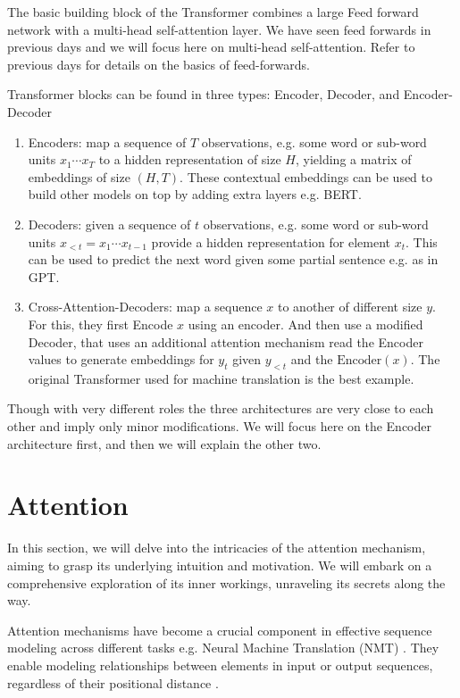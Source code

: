 The basic building block of the Transformer combines a large Feed forward network with a multi-head self-attention layer. We have seen feed forwards in previous days and we will focus here on multi-head self-attention. Refer to previous days for details on the basics of feed-forwards.

Transformer blocks can be found in three types: Encoder, Decoder, and Encoder-Decoder 

\begin{enumerate}
\item Encoders: map a sequence of $T$ observations, e.g. some word or sub-word units $x_1 \cdots x_T$ to a hidden representation of size $H$, yielding a matrix of embeddings of size $(H, T)$. These contextual embeddings can be used to build other models on top by adding extra layers e.g. BERT.
\item Decoders: given a sequence of $t$ observations, e.g. some word or sub-word units $x_{<t} = x_1 \cdots x_{t-1}$ provide a hidden representation for element $x_t$. This can be used to predict the next word given some partial sentence e.g. as in GPT. 
\item Cross-Attention-Decoders: map a sequence $x$ to another of different size $y$. For this, they first Encode $x$ using an encoder. And then use a modified Decoder, that uses an additional attention mechanism read the Encoder values to generate embeddings for $y_t$ given $y_{<t}$ and the $\mathrm{Encoder}(x)$. The original Transformer used for machine translation is the best example.
\end{enumerate}

Though with very different roles the three architectures are very close to each other and imply only minor modifications. We will focus here on the Encoder architecture first, and then we will explain the other two.

\section{Attention}
In this section, we will delve into the intricacies of the attention mechanism, aiming to grasp its underlying intuition and motivation. We will embark on a comprehensive exploration of its inner workings, unraveling its secrets along the way.

Attention mechanisms have become a crucial component in effective sequence modeling across different tasks e.g. Neural Machine Translation (NMT) \citep{vaswani2017attention}. They enable modeling relationships between elements in input or output sequences, regardless of their positional distance \citep{bahdanau2014neural, kim2017structured}.

